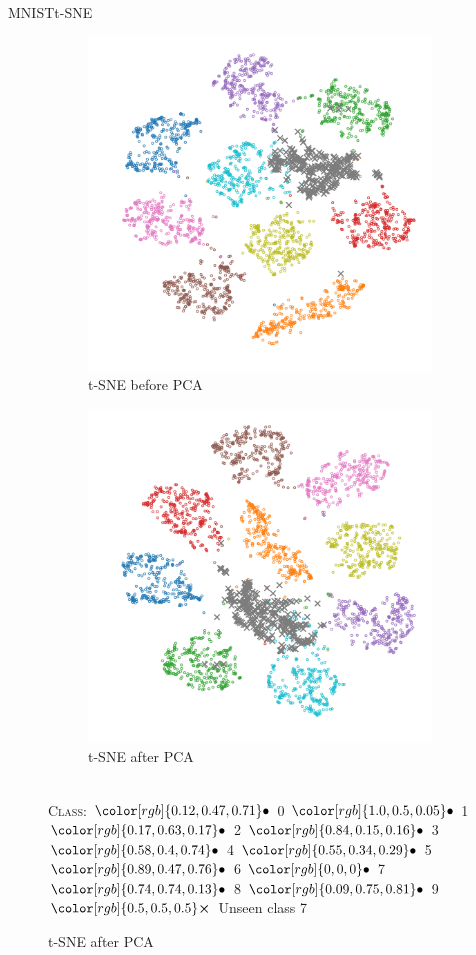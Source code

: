 \documentclass{beamer}
\newcommand{\legendBulletMNIST}{\footnotesize
		\centering
		\textsc{Class}:
		${\color[rgb]{0.12, 0.47, 0.71}\bullet}$ 0
		${\color[rgb]{1.0, 0.5, 0.05}\bullet}$ 1
		${\color[rgb]{0.17, 0.63, 0.17}\bullet}$ 2
		${\color[rgb]{0.84, 0.15, 0.16}\bullet}$ 3
		${\color[rgb]{0.58, 0.4, 0.74}\bullet}$ 4
		${\color[rgb]{0.55, 0.34, 0.29}\bullet}$ 5
		${\color[rgb]{0.89, 0.47, 0.76}\bullet}$ 6
		${\color[rgb]{0, 0, 0}\bullet}$ 7
		${\color[rgb]{0.74, 0.74, 0.13}\bullet}$ 8
		${\color[rgb]{0.09, 0.75, 0.81}\bullet}$ 9\\
		${\color[rgb]{0.5, 0.5, 0.5}\boldsymbol{\times}}$ Unseen class
}
\begin{document}
\begin{frame}{\gls{MNIST}}{\gls{t-SNE}}
	\begin{figure}[H]
		\centering
		\begin{subfigure}{.49\textwidth}
			\centering
			\includegraphics[width=\textwidth]{MNIST_t-SNE_wo_cl_7_before}
			\caption{\acrshort{t-SNE} before \acrshort{PCA}}
		\end{subfigure}
		\begin{subfigure}{.5\textwidth}
			\centering
			\includegraphics[width=\textwidth]{MNIST_t-SNE_wo_cl_7_after}
			\caption{\acrshort{t-SNE} after \acrshort{PCA}}
		\end{subfigure}
		\\[.2cm]
		\legendBulletMNIST 7
		\label{fig:tsne-mnist}
	\end{figure}
\end{frame}
\end{document}
